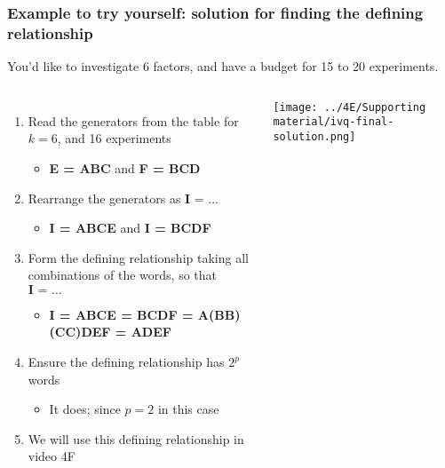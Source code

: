 \begin{frame}\frametitle{Example to try yourself: {\color{myOrange}solution} for finding the defining relationship}
	
	\vspace{0.5cm}
	You'd like to investigate 6 factors, and have a budget for 15 to 20 experiments.
	
	\vspace{0.5cm}
	\begin{columns}[T]
			\begin{enumerate}
				\item	Read the generators from the table for $k=6$, and 16 experiments
					\begin{itemize}
						\item	\textbf{E = ABC}	and  \textbf{F = BCD}
					\end{itemize}
				\item	Rearrange the generators as  $\textbf{I = \ldots}$
					\begin{itemize}
						\item	\textbf{I = ABCE}	and  \textbf{I = BCDF}
					\end{itemize}
			 	\item	Form the {\color{purple}defining relationship} taking all combinations of the words, so that $\textbf{I = \ldots}$
					\begin{itemize}
						\item	\textbf{I = ABCE = BCDF = A(BB)(CC)DEF = ADEF}
					\end{itemize}
			 	\item	Ensure the defining relationship has $2^p$ words
					\begin{itemize}
						\item	It does; since $p=2$ in this case
					\end{itemize} 
				\item	We will use this defining relationship in video 4F
			\end{enumerate}
			
			\centerline{\texttt{[image: ../4E/Supporting material/ivq-final-solution.png]}}

	\end{columns}

	
\end{frame}

